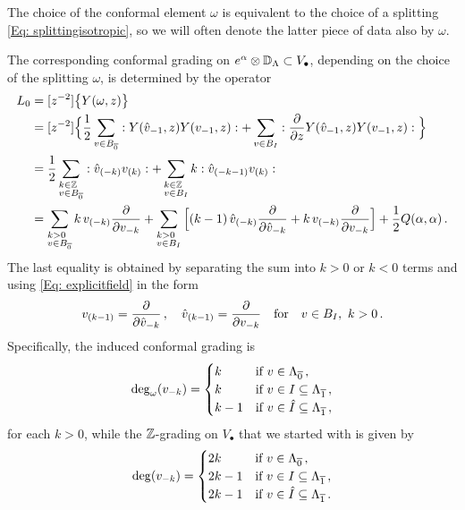 \documentclass[a4paper, 12pt]{amsart}
\begin{document}
\begin{remark}
    The choice of the conformal element $\omega$ is equivalent to the choice of a splitting 
 \eqref{Eq: splittingisotropic}, so we will often denote the latter piece of data also by $\omega$. 
\end{remark}

The corresponding conformal grading on $e^\alpha\otimes {\mathbb{D}}_\Lambda\subset V_\bullet$, depending on the choice of the splitting $\omega$, is determined by the operator
\begin{align*}
L_0
&=[z^{-2}]\big\{Y(\omega,z)\big\}\\ 
&=[z^{-2}]\Big\{\frac{1}{2}\sum_{v\in B_{\ovZ}}:Y(\hat{v}_{-1},z)Y(v_{-1},z):
+\sum_{v\in B_I}:\frac{\partial}{\partial z}Y(\hat{v}_{-1},z)Y(v_{-1},z):\Big \}\\
&=\frac{1}{2}\sum_{\begin{subarray} a k\in\BZ\\
v\in B_{\ovZ}\end{subarray}}:\hat{v}_{(-k)}v_{(k)}:
+\sum_{\begin{subarray} a k\in\BZ\\
v\in B_I\end{subarray}}k:\hat{v}_{(-k-1)}v_{(k)}:
\\
&=\sum_{\begin{subarray} a k> 0\\
v\in B_{\ovZ}\end{subarray}}k\,v_{(-k)}\frac{\partial}{\partial v_{-k}}
+\sum_{\begin{subarray} a k> 0\\ v\in B_I\end{subarray}}
\Big[(k-1)\,\hat{v}_{(-k)}\frac{\partial}{\partial \hat{v}_{-k}}+k\,v_{(-k)}\frac{\partial}{\partial v_{-k}}\Big] 
+\frac{1}{2}Q(\alpha,\alpha)
\,.
\end{align*}
The last equality is obtained by separating the sum into $k>0$ or $k<0$ terms and using \eqref{Eq: explicitfield} in the form
\[v_{(k-1)}=\frac{\partial}{\partial \hat v_{-k}}\,,\quad \hat v_{(k-1)}=\frac{\partial}{\partial v_{-k}} \quad \textup{for}\quad v\in B_I,\ k> 0\,.\]
Specifically, the induced conformal grading is 
$$\deg_{\omega}(v_{-k})=\begin{cases}
k &\textup{if }v\in \Lambda_{\overline 0}\,,\\
k &\textup{if }v\in I\subseteq \Lambda_{\overline 1}\,,\\
k-1 &\textup{if }v\in \hat I\subseteq \Lambda_{\overline 1}\,,
\end{cases}
$$
for each $k>0$, while the ${\mathbb{Z}}$-grading on $V_\bullet$ that we started with is given by 
$$\deg(v_{-k})=\begin{cases}
2k &\textup{if }v\in \Lambda_{\overline 0}\,,\\
2k-1 &\textup{if }v\in I\subseteq \Lambda_{\overline 1}\,,\\
2k-1 &\textup{if }v\in \hat I\subseteq \Lambda_{\overline 1}\,.
\end{cases}
$$
\end{document}
